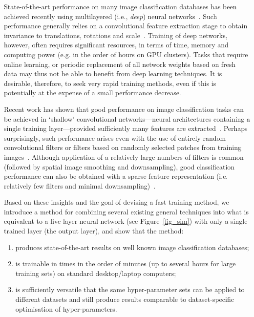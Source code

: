 \documentclass[conference]{IEEEtran}
\begin{document}
State-of-the-art performance on many image classification databases has been achieved recently using multilayered (i.e., {\em deep}) neural networks~\cite{Schmidhuber.15}.
Such performance generally relies on a convolutional feature extraction stage to obtain invariance to translations, rotations and scale~\cite{LeCun.98,Coates.11,Coates.11a,Le.10}. Training of deep networks, however, often requires significant resources, in terms of time, memory and computing power (e.g. in the order of hours on GPU clusters). Tasks that require online learning, or periodic replacement of all network weights based on fresh data may thus not be able to benefit from deep learning techniques. It is desirable, therefore, to seek very rapid training methods, even if this is potentially at the expense of a small performance decrease. 

Recent work has shown that good performance on image classification tasks can be achieved in `shallow' convolutional networks---neural architectures containing a single training layer---provided sufficiently many features are extracted~\cite{Coates.11}. Perhaps surprisingly, such performance arises even with the use of entirely random convolutional filters or filters based on randomly selected patches from training images~\cite{Coates.11a}. Although application of a relatively large numbers of filters is common (followed by spatial image smoothing and downsampling), good classification performance can also be obtained with a sparse feature representation (i.e. relatively few filters and minimal downsampling)~\cite{Le.10}.

Based on these insights and the goal of devising a fast training method, we introduce a method for combining several existing general techniques into what is equivalent to a five layer neural network (see Figure~\ref{fig_sim}) with only a single trained layer (the output layer), and show that the method:
\begin{enumerate}
\item produces state-of-the-art results on  well known image classification databases;
\item is trainable in times in the order of minutes (up to several hours for large training sets) on standard desktop/laptop  computers;
\item is sufficiently versatile that the same hyper-parameter sets can be applied to different datasets and still produce results comparable to dataset-specific optimisation of hyper-parameters.
\end{enumerate}
\end{document}
